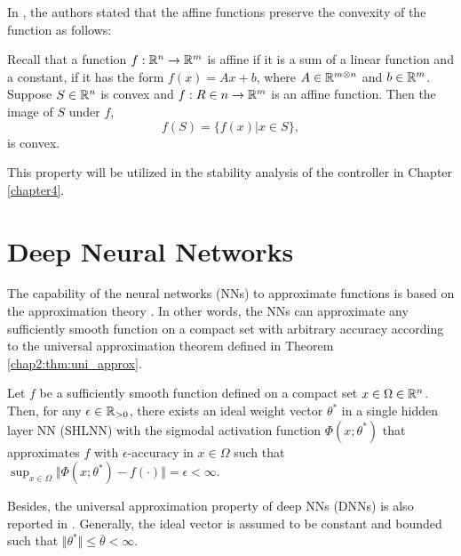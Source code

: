 In \cite[Chapter 2.3.2]{RN1}, the authors stated that the affine functions preserve the convexity of the function as follows:
\begin{displayquote}
  
  Recall that a function $f:\mathbb{R}^n\to\mathbb{R}^m$ is affine if it is a sum of a linear function and a constant, \ie if it has the form $f(x) = Ax + b$, where $A\in\mathbb{R}^{m\otimes n}$ and $b\in\mathbb{R}^m$. Suppose $S\in\mathbb{R}^n$ is convex and $f:R\in n\to\mathbb{R}^m$ is an affine function. Then the image of $S$ under $f$,
  \begin{equation}
    f(S) = \{ f(x) | x\in S \}
    ,
  \end{equation}
  is convex.

\end{displayquote}
This property will be utilized in the stability analysis of the controller in Chapter \ref{chapter4}.

\section{Deep Neural Networks}


The capability of the neural networks (NNs) to approximate functions is based on the approximation theory \cite{RN4}. 
In other words, the NNs can approximate any sufficiently smooth function on a compact set with arbitrary accuracy according to the universal approximation theorem defined in Theorem \ref{chap2:thm:uni_approx}.

\begin{theorem}

  Let $f$ be a sufficiently smooth function defined on a compact set $x\in\Omega\in\mathbb{R}^n$.
  Then, for any $\epsilon\in\mathbb{R}_{>0}$, there exists an ideal weight vector $\theta^*$ in a single hidden layer NN (SHLNN) with the sigmodal activation function $\Phi(x;\theta^*)$ that approximates $f$ with $\epsilon$-accuracy in $x\in\Omega$ such that $\sup_{x\in\Omega}\Vert \Phi(x;\theta^*) - f(\cdot) \Vert = \epsilon < \infty$.

  \label{chap2:thm:uni_approx}
\end{theorem}

Besides, the universal approximation property of deep NNs (DNNs) is also reported in \cite{RN70}.
Generally, the ideal vector is assumed to be constant and bounded such that $\Vert\theta^*\Vert\le \bar\theta <\infty$.

